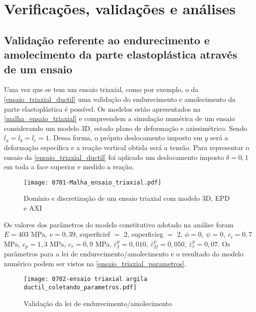 \chapter{Verificações, validações e análises}\label{Algumas_verificacoes_validacoes}

\section{Validação referente ao endurecimento e amolecimento da parte elastoplástica através de um ensaio}

Uma vez que se tem um ensaio triaxial, como por exemplo, o da \autoref{ensaio_triaxial_ductil} uma validação do endurecimento e amolecimento da parte elastoplástica é possível. Os modelos estão apresentados na \autoref{malha_ensaio_triaxial} e compreendem a simulação numérica de um ensaio considerando um modelo 3D, estado plano de deformação e axissimétrico. Sendo $l_a = l_b = l_c = 1$. Dessa forma, o próprio deslocamento imposto em $y$ será a deformação específica e a reação vertical obtida será a tensão. Para representar o ensaio da \autoref{ensaio_triaxial_ductil} foi aplicado um deslocamento imposto $\delta = 0,1$ em toda a face superior e medido  a reação.

\begin{figure}[H]
	\begin{center}
		\texttt{[image: 0701-Malha\_ensaio\_triaxial.pdf]}
	\end{center}
	\caption{\label{malha_ensaio_triaxial}Domínio e discretização de um ensaio triaxial com modelo 3D, EPD e AXI}
\end{figure}

Os valores dos parâmetros do modelo constitutivo adotado na análise foram $E = 403$ MPa, $\nu = 0,39$,  superficief $=$ 2, superficieg $=$ 2, $\phi = 0,~\psi = 0,~c_i = 0,7$ MPa, $c_p = 1,3$ MPa, $c_r = 0,9$ MPa, $\bar \varepsilon^p_{I} = 0,010,~\bar \varepsilon^p_{II} = 0,050,~\bar \varepsilon^p_{r} = 0,07$. Os parâmetros para a lei de endurecimento/amolecimento e o resultado do modelo numérico podem ser vistos na \autoref{ensaio_triaxial_parametros}.
 
\begin{figure}[H]
 	\begin{center}
 		\texttt{[image: 0702-ensaio triaxial argila ductil\_coletando\_parametros.pdf]}
 	\end{center}
 	\caption{\label{ensaio_triaxial_parametros}Validação da lei de endurecimento/amolecimento}
\end{figure}

